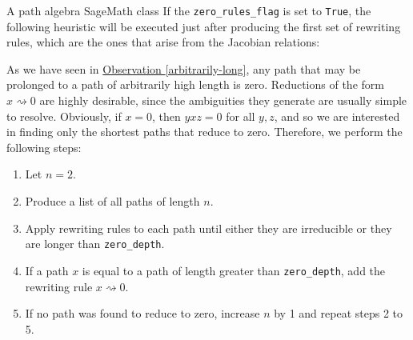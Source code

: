\begin{chapter}{A path algebra SageMath class}
If the \texttt{zero\_rules\_flag} is set to \texttt{True}, the following heuristic will be executed just after producing the first set of rewriting rules, which are the ones that arise from the Jacobian relations:
\begin{heur} As we have seen in \hyperref[arbitrarily-long]{Observation \ref*{arbitrarily-long}},  any path that may be prolonged to a path of arbitrarily high length is zero. Reductions of the form $x\rightsquigarrow 0$ are highly desirable, since the ambiguities they generate are usually simple to resolve. Obviously, if $x=0$, then $yxz=0$ for all $y,z$, and so we are interested in finding only the shortest paths that reduce to zero. Therefore, we perform the following steps:
\begin{enumerate}
\item Let $n=2$.
\item Produce a list of all paths of length $n$.
\item Apply rewriting rules to each path until either they are irreducible or they are longer than \texttt{zero\_depth}.
\item If a path $x$ is equal to a path of length greater than \texttt{zero\_depth}, add the rewriting rule $x\rightsquigarrow 0$.
\item If no path was found to reduce to zero, increase $n$ by 1 and repeat steps 2 to 5.
\end{enumerate}
\end{heur}


\end{chapter}
